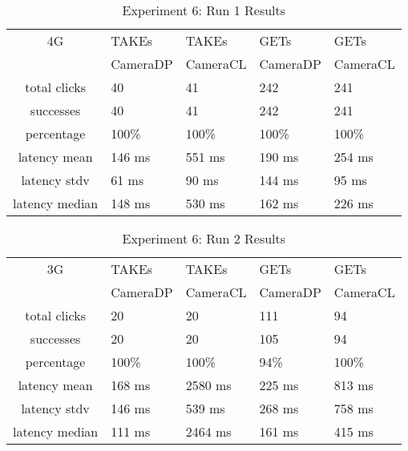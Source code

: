 \begin{table}[htb]
\begin{scriptsize} 
\caption{Experiment 6: Run 1 Results} 
\label{table:exp-6-run1-results}
 \begin{center}
 \begin{tabular}{| c | p{1.5cm} | p{1.5cm} | p{1.5cm} | p{1.4cm} |}
  \hline
  4G & TAKEs & TAKEs & GETs & GETs \\
  & CameraDP & CameraCL & CameraDP & CameraCL \\
  \hline
  total clicks & 40 & 41 & 242 & 241 \\
  \hline
  successes & 40 & 41 & 242 & 241 \\
  \hline
  percentage & 100\% & 100\% & 100\% & 100\% \\
  \hline
  latency mean & 146 ms & 551 ms & 190 ms & 254 ms \\
  \hline
  latency stdv & 61 ms & 90 ms & 144 ms &  95 ms \\
  \hline
  latency median & 148 ms & 530 ms & 162 ms & 226 ms \\
  \hline
  \end{tabular}

  \end{center}
\end{scriptsize}
\end{table}
\begin{table}[htb]
\begin{scriptsize} 
\caption{Experiment 6: Run 2 Results} 
\label{table:exp-6-run2-results}
 \begin{center}
 \begin{tabular}{| c | p{1.5cm} | p{1.5cm} | p{1.5cm} | p{1.4cm} |}
  \hline
  3G & TAKEs & TAKEs & GETs & GETs \\
  & CameraDP & CameraCL & CameraDP & CameraCL \\
  \hline
  total clicks & 20 & 20 & 111 &  94 \\
  \hline
  successes & 20 & 20 & 105 & 94 \\
  \hline
  percentage & 100\% & 100\% & 94\% & 100\% \\
  \hline
  latency mean & 168 ms & 2580 ms & 225 ms & 813 ms \\
  \hline
  latency stdv & 146 ms & 539 ms & 268 ms & 758 ms \\
  \hline
  latency median & 111 ms & 2464 ms & 161 ms & 415 ms \\
  \hline
  \end{tabular}
  \end{center}
\end{scriptsize}
\end{table}
